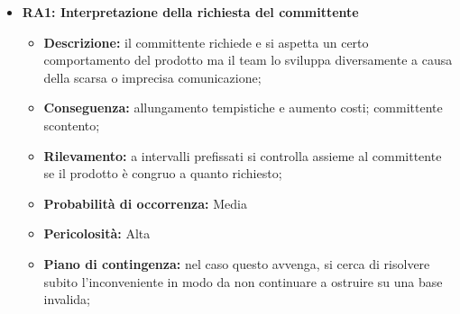 \begin{itemize}
	\item \textbf{RA1: Interpretazione della richiesta del committente}
	\begin{itemize}
		\item \textbf{Descrizione:} il committente richiede e si aspetta un certo comportamento del prodotto ma il team lo sviluppa diversamente a causa della scarsa o imprecisa comunicazione;
		\item \textbf{Conseguenza:} allungamento tempistiche e aumento costi; committente scontento;
		\item \textbf{Rilevamento:} a intervalli prefissati si controlla assieme al committente se il prodotto è congruo a quanto richiesto;
		\item \textbf{Probabilità di occorrenza:} Media
		\item \textbf{Pericolosità:} Alta
		\item \textbf{Piano di contingenza:} nel caso questo avvenga, si cerca di risolvere subito l'inconveniente in modo da non continuare a ostruire su una base invalida;
	\end{itemize}
	
	
\end{itemize}